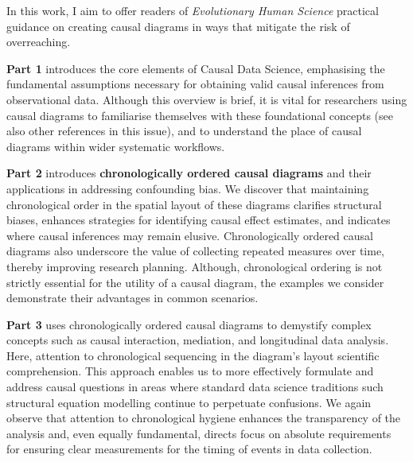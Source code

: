 \documentclass[
  singlecolumn,
  9pt]{article}
\begin{document}
In this work, I aim to offer readers of \emph{Evolutionary Human
Science} practical guidance on creating causal diagrams in ways that
mitigate the risk of overreaching.

\textbf{Part 1} introduces the core elements of Causal Data Science,
emphasising the fundamental assumptions necessary for obtaining valid
causal inferences from observational data. Although this overview is
brief, it is vital for researchers using causal diagrams to familiarise
themselves with these foundational concepts (see also other references
in this issue), and to understand the place of causal diagrams within
wider systematic workflows.

\textbf{Part 2} introduces \textbf{chronologically ordered causal
diagrams} and their applications in addressing confounding bias. We
discover that maintaining chronological order in the spatial layout of
these diagrams clarifies structural biases, enhances strategies for
identifying causal effect estimates, and indicates where causal
inferences may remain elusive. Chronologically ordered causal diagrams
also underscore the value of collecting repeated measures over time,
thereby improving research planning. Although, chronological ordering is
not strictly essential for the utility of a causal diagram, the examples
we consider demonstrate their advantages in common scenarios.

\textbf{Part 3} uses chronologically ordered causal diagrams to
demystify complex concepts such as causal interaction, mediation, and
longitudinal data analysis. Here, attention to chronological sequencing
in the diagram's layout scientific comprehension. This approach enables
us to more effectively formulate and address causal questions in areas
where standard data science traditions such structural equation
modelling continue to perpetuate confusions. We again observe that
attention to chronological hygiene enhances the transparency of the
analysis and, even equally fundamental, directs focus on absolute
requirements for ensuring clear measurements for the timing of events in
data collection.
\end{document}
